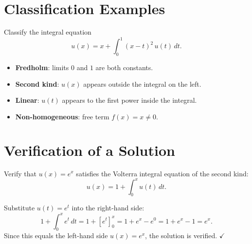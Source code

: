 \section{Classification Examples}

\begin{example}
Classify the integral equation
\[
  u(x) = x + \int_0^1 (x-t)^2\, u(t)\,dt.
\]

\begin{solution}
\begin{itemize}
  \item \textbf{Fredholm}: limits $0$ and $1$ are both constants.
  \item \textbf{Second kind}: $u(x)$ appears outside the integral on the left.
  \item \textbf{Linear}: $u(t)$ appears to the first power inside the integral.
  \item \textbf{Non-homogeneous}: free term $f(x) = x \neq 0$.
\end{itemize}
\end{solution}
\end{example}

\section{Verification of a Solution}

\begin{example}
Verify that $u(x) = e^x$ satisfies the Volterra integral equation of the second kind:
\[
  u(x) = 1 + \int_0^x u(t)\,dt.
\]

\begin{solution}
Substitute $u(t) = e^t$ into the right-hand side:
\[
  1 + \int_0^x e^t\,dt = 1 + \left[e^t\right]_0^x = 1 + e^x - e^0 = 1 + e^x - 1 = e^x.
\]
Since this equals the left-hand side $u(x) = e^x$, the solution is verified. $\checkmark$
\end{solution}
\end{example}
